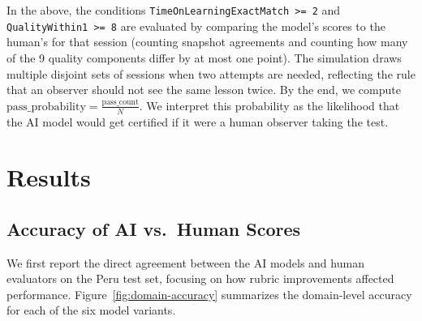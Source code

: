 \documentclass[12pt]{article}
\begin{document}
In the above, the conditions \texttt{TimeOnLearningExactMatch >= 2} and \texttt{QualityWithin1 >= 8} are evaluated by comparing the model’s scores to the human’s for that session (counting snapshot agreements and counting how many of the 9 quality components differ by at most one point). The simulation draws multiple disjoint sets of sessions when two attempts are needed, reflecting the rule that an observer should not see the same lesson twice. By the end, we compute \(\text{pass\_probability} = \tfrac{\text{pass\_count}}{N}\). We interpret this probability as the likelihood that the AI model would get certified if it were a human observer taking the test.

\section{Results}
\label{sec:results}
\subsection{Accuracy of AI vs.\ Human Scores}
\noindent We first report the direct agreement between the AI models and human evaluators on the Peru test set, focusing on how rubric improvements affected performance. Figure~\ref{fig:domain-accuracy} summarizes the domain-level accuracy for each of the six model variants.
\end{document}

